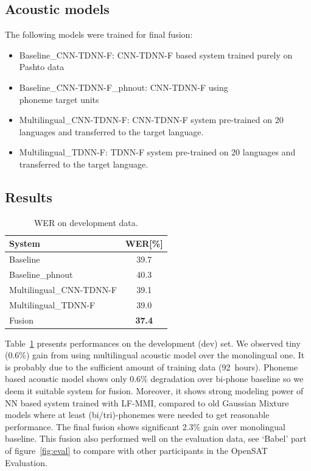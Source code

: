 \documentclass{article}
\begin{document}
\subsection{Acoustic models}
\label{sec:babelAM}

The following models were trained for final fusion:
\begin{itemize}
\item Baseline\_CNN-TDNN-F: CNN-TDNN-F based system trained purely on Pashto data
\item Baseline\_CNN-TDNN-F\_phnout: CNN-TDNN-F using \\ phoneme target units
\item Multilingual\_CNN-TDNN-F: CNN-TDNN-F system pre-trained on 20
  languages and transferred to the target language.
\item Multilingual\_TDNN-F: TDNN-F system pre-trained on 20
  languages and transferred to the target language.
\end{itemize}

\subsection{Results}
\label{sec:babelresults}

\begin{table}[tb]
\caption{WER on development data.}
\label{tab:BABELwer}
\begin{center}
\begin{tabular}{lc}
\hline
System & WER[\%] \\
\hline
Baseline  & 39.7 \\
Baseline\_phnout & 40.3 \\
Multilingual\_CNN-TDNN-F & 39.1 \\
Multilingual\_TDNN-F & 39.0 \\
\hline
Fusion  & {\bf 37.4} \\
\hline
\end{tabular}
\end{center}
\end{table}

Table~\ref{tab:BABELwer} presents performances on the development (dev) set. We
observed tiny (0.6\%) gain from using multilingual acoustic model over the monolingual one. It is probably
due to the sufficient amount of training data (92~hours). Phoneme
based acoustic model shows only 0.6\% degradation over bi-phone
baseline so we deem it suitable system for fusion. Moreover, it shows strong modeling power of NN based system trained with LF-MMI, compared to old Gaussian Mixture models where at least (bi/tri)-phonemes were needed to get reasonable performance. The final fusion shows significant 2.3\% gain over monolingual baseline. 
This fusion also performed well on the evaluation data, see `Babel' part of figure~\ref{fig:eval} to compare with other participants in the OpenSAT Evaluation.
\end{document}
